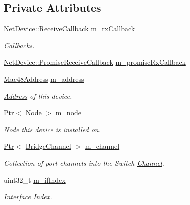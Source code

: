 \subsection*{Private Attributes}
\begin{DoxyCompactItemize}
\item 
\hyperlink{classns3_1_1NetDevice_ad5e5e1ca187472bc2ba99575d8def568}{Net\+Device\+::\+Receive\+Callback} \hyperlink{classns3_1_1OpenFlowSwitchNetDevice_ac6ed70a909dccd5edd66088d4560b89a}{m\+\_\+rx\+Callback}
\begin{DoxyCompactList}\small\item\em Callbacks. \end{DoxyCompactList}\item 
\hyperlink{classns3_1_1NetDevice_a427225795919f26c414bee2ea3f31ed2}{Net\+Device\+::\+Promisc\+Receive\+Callback} \hyperlink{classns3_1_1OpenFlowSwitchNetDevice_a9acb89d5f22b5e5c9114db32a0bbcbc5}{m\+\_\+promisc\+Rx\+Callback}
\item 
\hyperlink{classns3_1_1Mac48Address}{Mac48\+Address} \hyperlink{classns3_1_1OpenFlowSwitchNetDevice_a0278390fb81f277dac19d25482ad1bef}{m\+\_\+address}
\begin{DoxyCompactList}\small\item\em \hyperlink{classns3_1_1Address}{Address} of this device. \end{DoxyCompactList}\item 
\hyperlink{classns3_1_1Ptr}{Ptr}$<$ \hyperlink{classns3_1_1Node}{Node} $>$ \hyperlink{classns3_1_1OpenFlowSwitchNetDevice_a0a4333cc4bfb15852c2d9f87e801cbd8}{m\+\_\+node}
\begin{DoxyCompactList}\small\item\em \hyperlink{classns3_1_1Node}{Node} this device is installed on. \end{DoxyCompactList}\item 
\hyperlink{classns3_1_1Ptr}{Ptr}$<$ \hyperlink{classns3_1_1BridgeChannel}{Bridge\+Channel} $>$ \hyperlink{classns3_1_1OpenFlowSwitchNetDevice_a2544f1285545cf8e45878277be7b6778}{m\+\_\+channel}
\begin{DoxyCompactList}\small\item\em Collection of port channels into the Switch \hyperlink{classns3_1_1Channel}{Channel}. \end{DoxyCompactList}\item 
uint32\+\_\+t \hyperlink{classns3_1_1OpenFlowSwitchNetDevice_ad8be8954209401de3b29c6e4da106b89}{m\+\_\+if\+Index}
\begin{DoxyCompactList}\small\item\em Interface Index. \end{DoxyCompactList}\item 

\end{DoxyCompactItemize}
